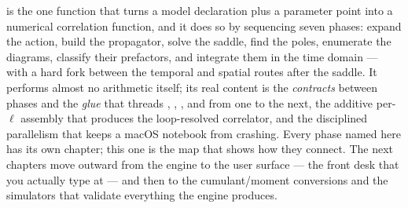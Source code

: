  is the one function that turns a model declaration plus
a parameter point into a numerical correlation function, and it does so by
sequencing seven phases: expand the action, build the propagator, solve the
saddle, find the poles, enumerate the diagrams, classify their prefactors, and
integrate them in the time domain --- with a hard fork between the temporal and
spatial routes after the saddle. It performs almost no arithmetic itself; its
real content is the \emph{contracts} between phases and the \emph{glue} that
threads , , , and 
from one to the next, the additive per-$\ell$ assembly that produces the
loop-resolved correlator, and the disciplined parallelism that keeps a macOS
notebook from crashing. Every phase named here has its own chapter; this one is
the map that shows how they connect. The next chapters move outward from the
engine to the user surface --- the  front desk that you actually
type at --- and then to the cumulant/moment conversions and the simulators that
validate everything the engine produces.
